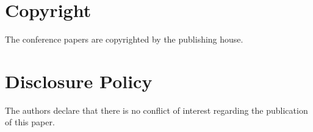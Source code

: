 \documentclass[11pt]{article}
\begin{document}
\section*{Copyright}
\label{sec:copyright}

The conference papers are copyrighted by the publishing house.

\section*{Disclosure Policy}
\label{sec:disclosure}

The authors declare that there is no conflict of interest regarding the
publication of this paper.

\newpage

\end{document}
